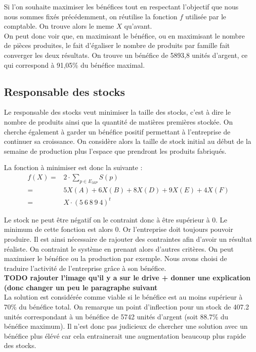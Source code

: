 \documentclass[a4paper, 11pt]{article}
\begin{document}
Si l’on souhaite maximiser les bénéfices tout en respectant l’objectif que nous
nous sommes fixés précédemment, on réutilise la fonction $f$ utilisée par le
comptable. On trouve alors le meme $X$ qu'avant. \\

On peut donc voir que, en maximisant le bénéfice, ou en maximisant le nombre de
pièces produites, le fait d’égaliser le nombre de produits par famille fait
converger les deux résultats. On trouve un bénéfice de 5893,8 unités d’argent,
ce qui correspond à 91,05\% du bénéfice maximal.

\subsection{Responsable des stocks}
Le responsable des stocks veut minimiser la taille des stocks, c'est à dire le
nombre de produits ainsi que la quantité de matières premières stockée. On
cherche également à garder un bénéfice positif permettant à l'entreprise de
continuer sa croissance. On considère alors la taille de stock initial au début
de la semaine de production plus l'espace que prendront les produits fabriqués.

La fonction à minimiser est donc la suivante : \\
$$
\begin{array}{rl}
    f(X) = & 2\cdot \sum_{p\in E_{MP}} S(p) \\
    = & 5 X(A) + 6 X(B) + 8 X(D) + 9 X(E) + 4 X(F) \\
    = & X\cdot(5~6~8~9~4)^t
\end{array}
$$

Le stock ne peut être négatif on le contraint donc à être supérieur à 0. Le
minimum de cette fonction est alors 0. Or l'entreprise doit toujours pouvoir
produire. Il est ainsi nécessaire de rajouter des contraintes afin d'avoir un
résultat réaliste. On contraint le système en prenant alors d'autres
critères. On peut maximiser le bénéfice ou la production par exemple. Nous
avons choisi de traduire l’activité de l’entreprise grâce à son bénéfice. \\

\textbf{TODO rajouter l'image qu'il y a sur le drive
+ donner une explication (donc changer un peu le paragraphe suivant} \\

La solution est considérée comme viable si le bénéfice est au moins supérieur à
70\% du bénéfice total. On remarque un point d’inflection pour un stock de
407.2 unités correspondant à un bénéfice de 5742 unités d’argent (soit 88.7\% du
bénéfice maximum). Il n’est donc pas judicieux de chercher une solution avec
un bénéfice plus élévé car cela entrainerait une augmentation beaucoup plus
rapide des stocks. \\
\end{document}
